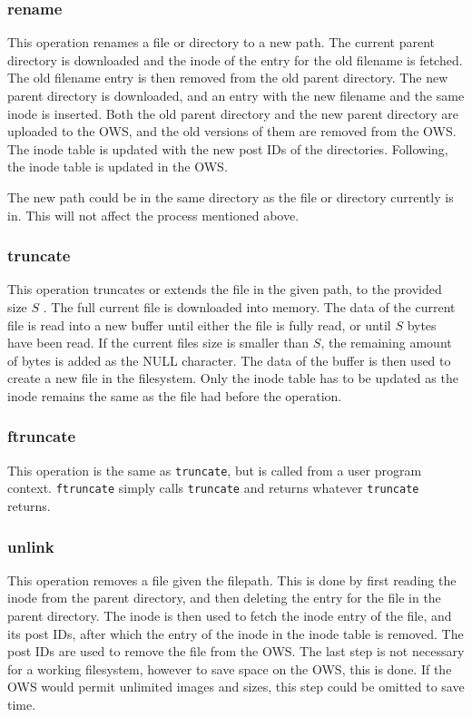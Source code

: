 \subsubsection{rename}
This operation renames a file or directory to a new path. The current parent directory is downloaded and the inode of the entry for the old filename is fetched. The old filename entry is then removed from the old parent directory. The new parent directory is downloaded, and an entry with the new filename and the same inode is inserted. Both the old parent directory and the new parent directory are uploaded to the OWS, and the old versions of them are removed from the OWS. The inode table is updated with the new post IDs of the directories. Following, the inode table is updated in the OWS.

The new path could be in the same directory as the file or directory currently is in. This will not affect the process mentioned above.

\subsubsection{truncate}
This operation truncates or extends the file in the given path, to the provided size $S$ . The full current file is downloaded into memory. The data of the current file is read into a new buffer until either the file is fully read, or until $S$ bytes have been read. If the current files size is smaller than $S$, the remaining amount of bytes is added as the NULL character. The data of the buffer is then used to create a new file in the filesystem. Only the inode table has to be updated as the inode remains the same as the file had before the operation.

\subsubsection{ftruncate}
This operation is the same as \texttt{truncate}, but is called from a user program context. \texttt{ftruncate} simply calls \texttt{truncate} and returns whatever \texttt{truncate} returns.

\subsubsection{unlink}
This operation removes a file given the filepath. This is done by first reading the inode from the parent directory, and then deleting the entry for the file in the parent directory. The inode is then used to fetch the inode entry of the file, and its post IDs, after which the entry of the inode in the inode table is removed. The post IDs are used to remove the file from the OWS. The last step is not necessary for a working filesystem, however to save space on the OWS, this is done. If the OWS would permit unlimited images and sizes, this step could be omitted to save time.

